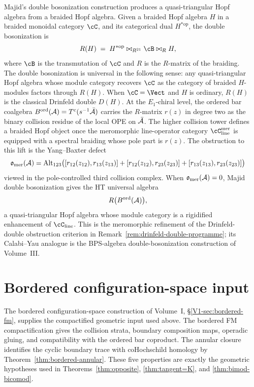 \begin{remark}
\label{rem:dimofte-double-bosonization}
Majid's double bosonization construction \cite{Majid95} produces a quasi-triangular Hopf algebra from a braided Hopf algebra. Given a braided Hopf algebra $H$ in a braided monoidal category $\cC$, and its categorical dual $H^{*\mathrm{op}}$, the double bosonization is
\begin{equation}
\label{eq:double-bosonization}
R(H) \;=\; H^{*\mathrm{op}} \bowtie_{R^{21}} \cB \bowtie_R H,
\end{equation}
where $\cB$ is the transmutation of $\cC$ and $R$ is the $R$-matrix of the braiding. The double bosonization is universal in the following sense: any quasi-triangular Hopf algebra whose module category recovers $\cC$ as the category of braided $H$-modules factors through $R(H)$. When $\cC = \Vect$ and $H$ is ordinary, $R(H)$ is the classical Drinfeld double $D(H)$.
At the $E_1$-chiral level, the ordered bar coalgebra
$B^{\mathrm{ord}}(\mathcal{A})=T^c(s^{-1}\bar{\mathcal{A}})$ carries the $R$-matrix
$r(z)$ in degree two as the binary collision residue of the local OPE
on $\bar{\mathcal{A}}$. The higher collision tower defines a braided Hopf object
once the meromorphic line-operator category
$\cC_{\mathrm{line}}^{\mathrm{mer}}$ is equipped with a spectral
braiding whose pole part is $r(z)$. The obstruction to this lift is the
Yang--Baxter defect
\[
 \mathfrak{o}_{\mathrm{mer}}(\mathcal{A})
 =
 \operatorname{Alt}_{123}
 \bigl([r_{12}(z_{12}),r_{13}(z_{13})]
      +[r_{12}(z_{12}),r_{23}(z_{23})]
      +[r_{13}(z_{13}),r_{23}(z_{23})]\bigr)
\]
viewed in the pole-controlled third collision complex. When
\(\mathfrak{o}_{\mathrm{mer}}(\mathcal{A})=0\), Majid double bosonization gives
the HT universal algebra
\[
 R\bigl(B^{\mathrm{ord}}(\mathcal{A})\bigr),
\]
a quasi-triangular Hopf algebra whose module category is a rigidified
enhancement of \(\cC_{\mathrm{line}}\). This is the meromorphic
refinement of the Drinfeld-double obstruction criterion in
Remark~\ref{rem:drinfeld-double-programme}; its Calabi--Yau analogue is
the BPS-algebra double-bosonization construction of Volume~III.
\end{remark}

\section{Bordered configuration-space input}
\label{sec:integration}

The bordered configuration-space construction of Volume~I,
\S\ref*{V1-sec:bordered-fm}, supplies the compactified geometric input
used above. The bordered FM compactification gives the collision
strata, boundary composition maps, operadic gluing, and compatibility
with the ordered bar coproduct. The annular closure identifies the
cyclic boundary trace with coHochschild homology by
Theorem~\ref{thm:bordered-annular}. These five properties are exactly
the geometric hypotheses used in Theorems~\ref{thm:opposite},
\ref{thm:tangent=K}, and \ref{thm:bimod-bicomod}.


